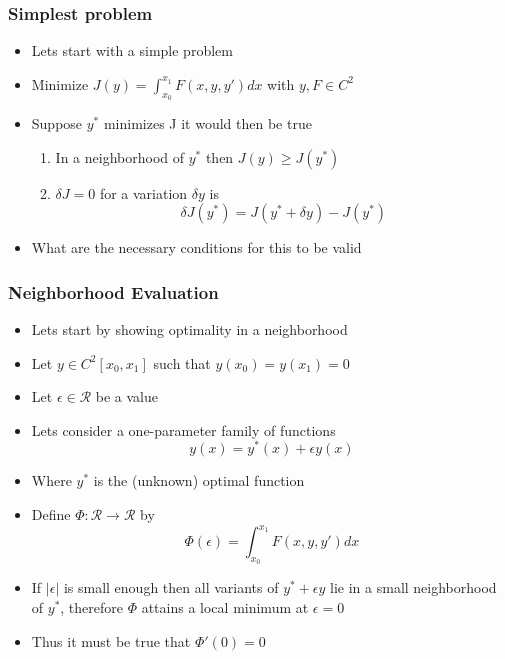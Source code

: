 \documentclass[10pt]{beamer}
\begin{document}
\begin{frame}
  \frametitle{Simplest problem}
  \begin{itemize}
  \item Lets start with a simple problem
  \item Minimize $J(y) = \int_{x_0}^{x_1} F(x, y, y') dx$ with $y, F \in C^2$
  \item Suppose $y^*$ minimizes J it would then be true
    \begin{enumerate}
    \item In a neighborhood of $y^*$ then $J(y) \geq J(y^*)$
    \item $\delta J = 0$ for a variation $\delta y$ is
      \[
        \delta J(y^*) = J(y^* + \delta y) - J(y^*)
      \]
    \end{enumerate}
  \item What are the necessary conditions for this to be valid
  \end{itemize}
\end{frame}

\begin{frame}
  \frametitle{Neighborhood Evaluation}
  \begin{itemize}
  \item Lets start by showing optimality in a neighborhood
  \item Let $y \in C^2[x_0, x_1]$ such that $y(x_0) = y(x_1) = 0$
  \item Let   $\epsilon \in \mathcal{R}$ be a value
  \item Lets consider a one-parameter family of functions
    \[
      y(x) = y^*(x) + \epsilon y(x)
    \]
  \item Where $y^*$ is the (unknown) optimal function
  \item Define $\Phi: \mathcal{R} \rightarrow \mathcal{R}$ by
    \[
      \Phi(\epsilon) = \int_{x_0}^{x_1} F(x, y, y') dx
    \]
  \item If $|\epsilon|$ is small enough then all variants of
    $y^* + \epsilon y$ lie in a small neighborhood of $y^*$,
    therefore $\Phi$ attains a local minimum at $\epsilon = 0$
  \item Thus it must be true that  $\Phi'(0) = 0$
  \end{itemize}
\end{frame}
\end{document}
